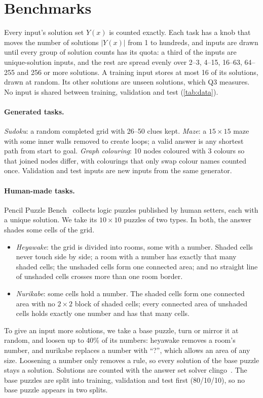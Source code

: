 \documentclass{article}
\newcommand{\Y}{|Y(x)|}
\begin{document}
\section{Benchmarks}
\label{sec:data}

Every input's solution set $Y(x)$ is counted exactly. Each task has a knob that moves the number of solutions $\Y$
from 1 to hundreds, and inputs are drawn until every group of solution counts has its quota: a third of the inputs are
unique-solution inputs, and the rest are spread evenly over 2--3, 4--15, 16--63, 64--255 and 256 or more solutions. A
training input stores at most 16 of its solutions, drawn at random. Its other solutions are unseen solutions, which
Q3 measures. No input is shared between training, validation and test (\cref{tab:data}).

\paragraph{Generated tasks.} \emph{Sudoku}: a random completed grid with 26--50 clues kept. \emph{Maze}: a
$15\times15$ maze with some inner walls removed to create loops; a valid answer is any shortest path from start to
goal. \emph{Graph colouring}: 10 nodes coloured with 3 colours so that joined nodes differ, with colourings that only
swap colour names counted once. Validation and test inputs are new inputs from the same generator.

\paragraph{Human-made tasks.} Pencil Puzzle Bench~\cite{ppbench2026} collects logic puzzles published by human setters,
each with a unique solution. We take its $10\times10$ puzzles of two types. In both, the answer shades some cells of
the grid.
\begin{itemize}
  \item \emph{Heyawake}: the grid is divided into rooms, some with a number. Shaded cells never touch side by side; a
  room with a number has exactly that many shaded cells; the unshaded cells form one connected area; and no straight
  line of unshaded cells crosses more than one room border.
  \item \emph{Nurikabe}: some cells hold a number. The shaded cells form one connected area with no $2\times2$ block
  of shaded cells; every connected area of unshaded cells holds exactly one number and has that many cells.
\end{itemize}
To give an input more solutions, we take a base puzzle, turn or mirror it at random, and loosen up to 40\% of its
numbers: heyawake removes a room's number, and nurikabe replaces a number with ``?'', which allows an area of any size.
Loosening a number only removes a rule, so every solution of the base puzzle stays a solution. Solutions are counted
with the answer set solver clingo~\cite{gebser2019clingo}. The base puzzles are split into training, validation and
test first (80/10/10), so no base puzzle appears in two splits.
\end{document}
